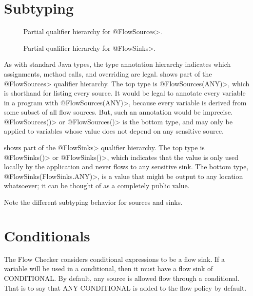 \section{Subtyping\label{sec:subtyping}}

\begin{figure}[h]
\caption{Partial qualifier hierarchy for \<@FlowSources>.}
\label{fig:flowsources-hierarchy}
\end{figure}

\begin{figure}[h]
\caption{Partial qualifier hierarchy for \<@FlowSinks>.}
\label{fig:flowsinks-hierarchy}
\end{figure}

As with standard Java types, the type annotation hierarchy indicates which
assignments, method calls, and overriding are legal.  
shows part of the \<@FlowSources>
qualifier hierarchy.  The top type is \<@FlowSources(ANY)>, which is
shorthand for listing every source.  It would be legal to annotate every
variable in a program with \<@FlowSources(ANY)>, because every variable is
derived from some subset of all flow sources.  But, such an annotation
would be imprecise.  \<@FlowSources(\ttcbs)> or \<@FlowSources()> is the
bottom type, and may only
be applied to variables whose value does not depend on any sensitive
source.


 shows part of the \<@FlowSinks>
qualifier hierarchy.  The top type is \<@FlowSinks(\ttcbs)> or
\<@FlowSinks()>, which indicates
that the value is only used locally by the application and never flows to
any sensitive sink.  The bottom type, \<@FlowSinks(FlowSinks.ANY)>, is a
value that might be output to any location whatsoever; it can be thought of
as a completely public value.

Note the different subtyping behavior for sources and sinks.




\section{Conditionals\label{sec:conditionals}}

The Flow Checker considers conditional expressions to be a flow sink.  If a variable 
will be used in a conditional, then it must have a flow sink of CONDITIONAL.  By default, 
any source is allowed flow through a conditional.  That is to say that 
ANY \flowsto{} CONDITIONAL is added to the flow policy by default. 

